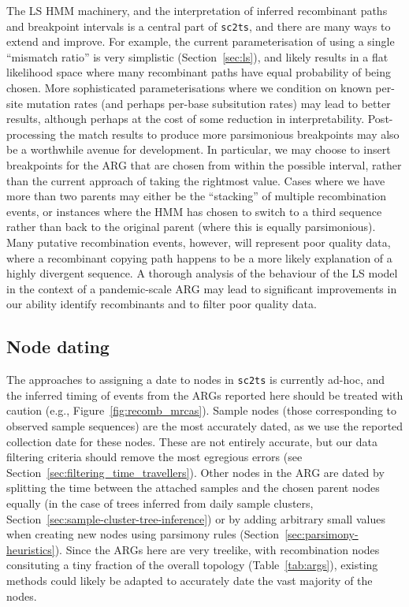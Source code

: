 \documentclass{article}
\begin{document}
The LS HMM machinery, and the interpretation of inferred recombinant paths and
breakpoint intervals is a central part of \texttt{sc2ts}, and there are many
ways to extend and improve. For example, the current parameterisation of using
a single ``mismatch ratio'' is very simplistic (Section~\ref{sec:ls}), and likely
results in a flat likelihood space where many recombinant paths have equal
probability of being chosen.
More sophisticated parameterisations where we
condition on known per-site mutation rates (and perhaps per-base subsitution
rates) may lead to better results, although perhaps at the cost of some
reduction in interpretability. Post-processing the match results to produce
more parsimonious breakpoints may also be a worthwhile avenue for development.
In particular, we may choose to insert breakpoints for the ARG that are chosen
from within the possible interval, rather than the current approach of taking
the rightmost value. Cases where we have more than two parents may either be
the ``stacking'' of multiple recombination events, or instances where
the HMM has chosen to switch to a third sequence rather than back to
the original parent (where this is equally parsimonious). Many putative
recombination events, however, will represent poor quality data, where
a recombinant copying path happens to be a more likely explanation
of a highly divergent sequence.
A thorough analysis of the behaviour of the LS model in the context
of a pandemic-scale ARG may lead to significant improvements in our
ability identify recombinants and to filter poor quality data.

\subsection{Node dating}
\label{sec:node_dating}
The approaches to assigning a date to nodes in \texttt{sc2ts} is currently
ad-hoc, and the inferred timing of events from the ARGs reported
here should be treated with caution (e.g., Figure~\ref{fig:recomb_mrcas}).
Sample nodes (those corresponding to observed sample sequences) are the
most accurately dated, as we use the reported collection date for
these nodes. These are not entirely accurate, but our data filtering
criteria should remove the most egregious errors (see
Section~\ref{sec:filtering_time_travellers}). Other nodes in the ARG
are dated by splitting the time between the attached samples
and the chosen parent nodes equally (in the case of
trees inferred from daily sample clusters,
Section~\ref{sec:sample-cluster-tree-inference}) or by adding arbitrary
small values when creating new nodes using parsimony rules
(Section~\ref{sec:parsimony-heuristics}). Since the ARGs here are
very treelike, with recombination nodes consituting a tiny fraction
of the overall topology (Table~\ref{tab:args}), existing methods
\cite[e.g.,][]{to2016fast} could likely be adapted to accurately
date the vast majority of the nodes.
\end{document}
